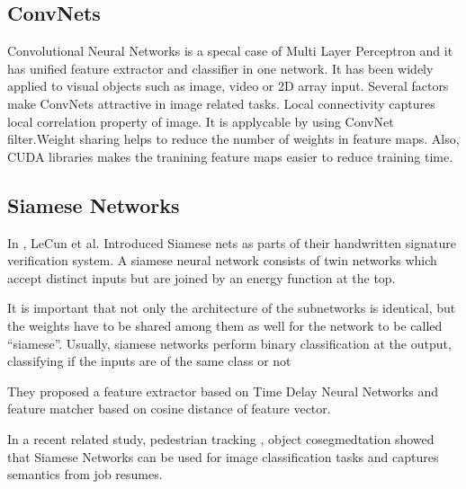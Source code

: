 \documentclass[runningheads]{llncs}
\begin{document}
\subsection{ConvNets}
Convolutional Neural Networks is a specal case of Multi Layer Perceptron and it has unified feature extractor and classifier in one network. It has been widely applied to visual objects such as image, video or 2D array input. Several factors make ConvNets attractive in image related tasks.
Local connectivity captures local correlation property of image. It is applycable by using ConvNet filter.Weight sharing helps to reduce the number of weights in feature maps.
Also, CUDA libraries makes the tranining feature maps easier to reduce training time.
%

\subsection{Siamese Networks}

In \cite{bromley1994signature}, LeCun et al. Introduced Siamese nets as parts of their handwritten signature verification system. 
A siamese neural network consists of twin networks which accept distinct inputs but are joined by an energy function at the top.\cite{koch2015siamese}


It is important that not only the architecture of the subnetworks is identical, but the weights have to be shared among them as well for the network to be called “siamese”.
Usually, siamese networks perform binary classification at the output, classifying if the inputs are of the same class or not



They proposed a feature extractor based on Time Delay Neural Networks\cite{lang1990time} and feature matcher based on cosine distance of feature vector. 





In a recent related study, pedestrian tracking \cite{Leal-Taixe_2016_CVPR_Workshops}, object cosegmedtation \cite{mukherjee2018object} showed that Siamese Networks can be used for image classification tasks and \cite{maheshwary2018matching} captures semantics from job resumes.
\end{document}
